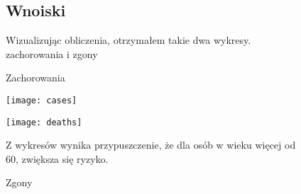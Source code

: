 \documentclass[12pt]{article}
\begin{document}
\begin{figure}[hbt!]
\subsection*{Wnoiski}
Wizualizując obliczenia, otrzymałem takie dwa wykresy.
\centering zachorowania i zgony
 \centering
 \caption{Zachorowania}
 \texttt{[image: cases]}
 \caption{Zgony} 
 \texttt{[image: deaths]}
 \begin{flushleft}
 Z wykresów wynika przypuszczenie, że dla osób w wieku więcej od 60, zwiększa się ryzyko.
 \end{flushleft} 
\end{figure}
\end{document}
